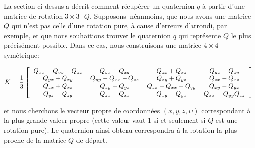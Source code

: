 La section ci-dessus a décrit comment récupérer un quaternion $q$ à partir d'une matrice de rotation 
$3\times3 \text{ } Q$. Supposons, néanmoins, que nous avons une matrice $Q$ qui n'est pas celle d'une rotation pure, 
à cause d'erreurs d'arrondi, par exemple, et que nous souhaitions trouver le quaternion $q$ qui représente 
$Q$ le plus précisément possible. Dans ce cas, nous construisons une matrice $4 \times 4$ symétrique:

\[
	K = \frac{1}{3}
	\left[
		\begin{tabular}{c c c c}
			$\Qxx - \Qyy -\Qzz$ & $\Qyx + \Qxy$ & $\Qzx + \Qxz$ & $\Qyz - \Qzy$ \\
			$\Qyx + \Qxy$ & $\Qyy - \Qxx - \Qzz$ & $\Qzy + \Qyz$ & $\Qzx - \Qxz$ \\
			$\Qzx + \Qxz$ & $\Qzy + \Qyz$ & $\Qzz - \Qxx - \Qyy$ & $\Qxy - \Qyx$ \\
			$\Qyz - \Qzy$ & $\Qzx - \Qxz$ & $\Qxy - \Qyx$ & $\Qxx + \Qyy \Qzz$
		\end{tabular}
	\right]
\]

et nous cherchons le vecteur propre de coordonnées $(x, y, z, w)$ correspondant 
à la plus grande valeur propre (cette valeur vaut 1 si et seulement si $Q$ 
est une rotation pure). Le quaternion ainsi obtenu correspondra à la rotation 
la plus proche de la matrice $Q$ de départ.